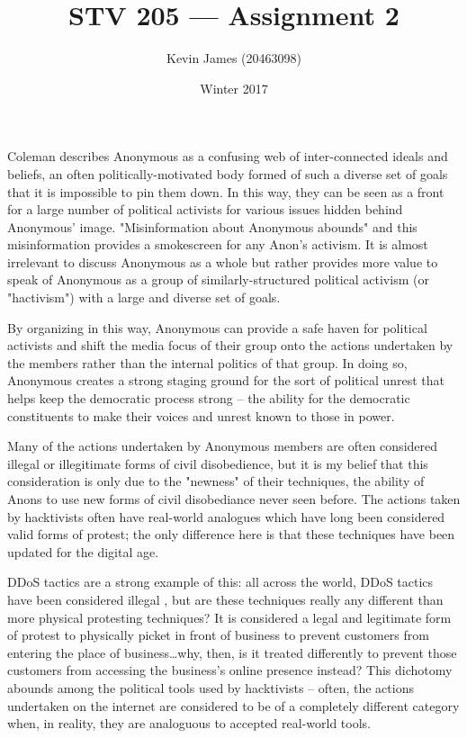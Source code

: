\documentclass[12pt]{article}
\begin{document}
\title{STV 205 --- Assignment 2}
\author{Kevin James (20463098)}
\date{\vspace{-2ex}Winter 2017}
\maketitle\HRule

\section*{}
Coleman describes Anonymous as a confusing web of inter-connected ideals and beliefs, an often politically-motivated body formed of such a diverse set of goals that it is impossible to pin them down. In this way, they can be seen as a front for a large number of political activists for various issues hidden behind Anonymous' image. "Misinformation about Anonymous abounds" \cite{coleman} and this misinformation provides a smokescreen for any Anon's activism. It is almost irrelevant to discuss Anonymous as a whole but rather provides more value to speak of Anonymous as a group of similarly-structured political activism (or "hactivism") with a large and diverse set of goals.

By organizing in this way, Anonymous can provide a safe haven for political activists and shift the media focus of their group onto the actions undertaken by the members rather than the internal politics of that group. In doing so, Anonymous creates a strong staging ground for the sort of political unrest that helps keep the democratic process strong -- the ability for the democratic constituents to make their voices and unrest known to those in power.

Many of the actions undertaken by Anonymous members are often considered illegal or illegitimate forms of civil disobedience, but it is my belief that this consideration is only due to the "newness" of their techniques, the ability of Anons to use new forms of civil disobediance never seen before. The actions taken by hacktivists often have real-world analogues which have long been considered valid forms of protest; the only difference here is that these techniques have been updated for the digital age.

DDoS tactics are a strong example of this: all across the world, DDoS tactics have been considered illegal \cite{ukddos}, but are these techniques really any different than more physical protesting techniques? It is considered a legal and legitimate form of protest to physically picket in front of business to prevent customers from entering the place of business\dots why, then, is it treated differently to prevent those customers from accessing the business's online presence instead? This dichotomy abounds among the political tools used by hacktivists -- often, the actions undertaken on the internet are considered to be of a completely different category when, in reality, they are analoguous to accepted real-world tools.
\end{document}
